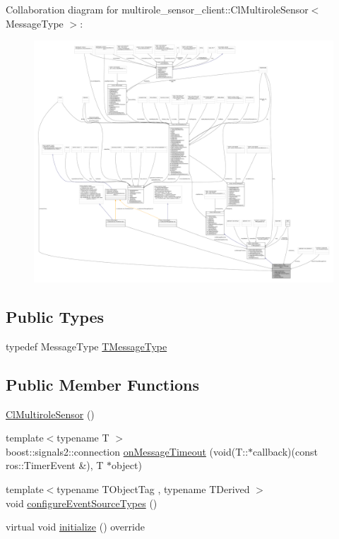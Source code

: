 Collaboration diagram for multirole\+\_\+sensor\+\_\+client\+:\+:Cl\+Multirole\+Sensor$<$ Message\+Type $>$\+:
\nopagebreak
\begin{figure}[H]
\begin{center}
\leavevmode
\includegraphics[width=350pt]{classmultirole__sensor__client_1_1ClMultiroleSensor__coll__graph}
\end{center}
\end{figure}
\subsection*{Public Types}
\begin{DoxyCompactItemize}
\item 
typedef Message\+Type \hyperlink{classmultirole__sensor__client_1_1ClMultiroleSensor_af6273a0b7c896dad766130706984071f}{T\+Message\+Type}
\end{DoxyCompactItemize}
\subsection*{Public Member Functions}
\begin{DoxyCompactItemize}
\item 
\hyperlink{classmultirole__sensor__client_1_1ClMultiroleSensor_a1d122d732da85dd3841096f294a8161e}{Cl\+Multirole\+Sensor} ()
\item 
{\footnotesize template$<$typename T $>$ }\\boost\+::signals2\+::connection \hyperlink{classmultirole__sensor__client_1_1ClMultiroleSensor_a525e83af3d81dff01600cfd6627890c5}{on\+Message\+Timeout} (void(T\+::$\ast$callback)(const ros\+::\+Timer\+Event \&), T $\ast$object)
\item 
{\footnotesize template$<$typename T\+Object\+Tag , typename T\+Derived $>$ }\\void \hyperlink{classmultirole__sensor__client_1_1ClMultiroleSensor_a243e8ec849d380d5934a384521423c9a}{configure\+Event\+Source\+Types} ()
\item 
virtual void \hyperlink{classmultirole__sensor__client_1_1ClMultiroleSensor_a8cd8e9766dd4e0f4d3be69d7979c5e50}{initialize} () override
\end{DoxyCompactItemize}
